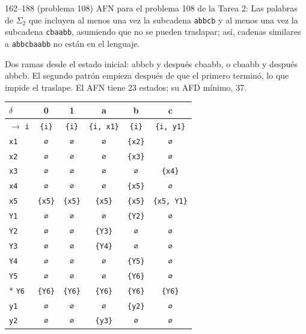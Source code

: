 \documentclass[11pt]{article}
\begin{document}
\begin{ejercicio}{162--188 (problema 108)}{}
AFN para el problema 108 de la Tarea 2: Las palabras de $\Sigma_2$ que incluyen al menos una vez la subcadena \texttt{abbcb} y al menos una vez la subcadena \texttt{cbaabb}, asumiendo que no se pueden traslapar; así, cadenas similares a \texttt{abbcbaabb} no están en el lenguaje.
\end{ejercicio}
\proc Dos ramas desde el estado inicial: abbcb y después cbaabb, o cbaabb y después abbcb. El segundo patrón empieza después de que el primero terminó, lo que impide el traslape. El AFN tiene 23 estados; su AFD mínimo, 37.
\begin{center}\small\begin{tabular}{lccccc}\toprule
$\delta$ & 0 & 1 & a & b & c \\\midrule
$\to$ \texttt{i} & \texttt{\{i\}} & \texttt{\{i\}} & \texttt{\{i, x1\}} & \texttt{\{i\}} & \texttt{\{i, y1\}} \\
 \texttt{x1} & \texttt{∅} & \texttt{∅} & \texttt{∅} & \texttt{\{x2\}} & \texttt{∅} \\
 \texttt{x2} & \texttt{∅} & \texttt{∅} & \texttt{∅} & \texttt{\{x3\}} & \texttt{∅} \\
 \texttt{x3} & \texttt{∅} & \texttt{∅} & \texttt{∅} & \texttt{∅} & \texttt{\{x4\}} \\
 \texttt{x4} & \texttt{∅} & \texttt{∅} & \texttt{∅} & \texttt{\{x5\}} & \texttt{∅} \\
 \texttt{x5} & \texttt{\{x5\}} & \texttt{\{x5\}} & \texttt{\{x5\}} & \texttt{\{x5\}} & \texttt{\{x5, Y1\}} \\
 \texttt{Y1} & \texttt{∅} & \texttt{∅} & \texttt{∅} & \texttt{\{Y2\}} & \texttt{∅} \\
 \texttt{Y2} & \texttt{∅} & \texttt{∅} & \texttt{\{Y3\}} & \texttt{∅} & \texttt{∅} \\
 \texttt{Y3} & \texttt{∅} & \texttt{∅} & \texttt{\{Y4\}} & \texttt{∅} & \texttt{∅} \\
 \texttt{Y4} & \texttt{∅} & \texttt{∅} & \texttt{∅} & \texttt{\{Y5\}} & \texttt{∅} \\
 \texttt{Y5} & \texttt{∅} & \texttt{∅} & \texttt{∅} & \texttt{\{Y6\}} & \texttt{∅} \\
$*$ \texttt{Y6} & \texttt{\{Y6\}} & \texttt{\{Y6\}} & \texttt{\{Y6\}} & \texttt{\{Y6\}} & \texttt{\{Y6\}} \\
 \texttt{y1} & \texttt{∅} & \texttt{∅} & \texttt{∅} & \texttt{\{y2\}} & \texttt{∅} \\
 \texttt{y2} & \texttt{∅} & \texttt{∅} & \texttt{\{y3\}} & \texttt{∅} & \texttt{∅} \\

\end{tabular}
\end{center}
\end{document}
